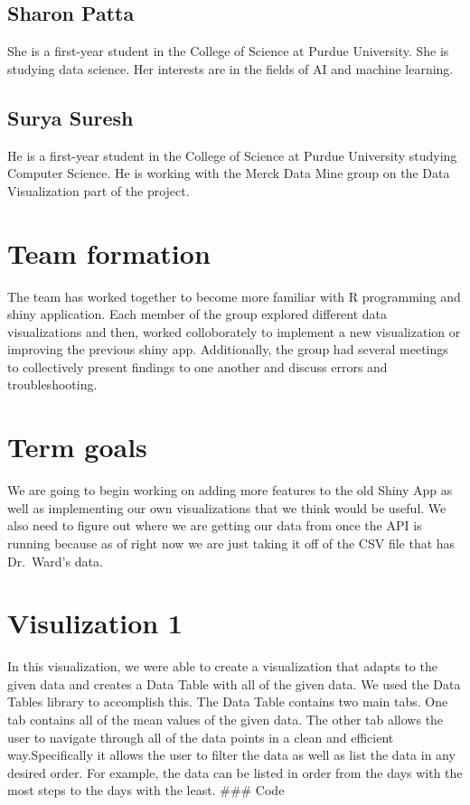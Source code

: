 \documentclass[]{book}
\begin{document}
\subsection{Sharon Patta}\label{sharon-patta}

She is a first-year student in the College of Science at Purdue
University. She is studying data science. Her interests are in the
fields of AI and machine learning.

\subsection{Surya Suresh}\label{surya-suresh}

He is a first-year student in the College of Science at Purdue
University studying Computer Science. He is working with the Merck Data
Mine group on the Data Visualization part of the project.

\section{Team formation}\label{team-formation}

The team has worked together to become more familiar with R programming
and shiny application. Each member of the group explored different data
visualizations and then, worked colloborately to implement a new
visualization or improving the previous shiny app. Additionally, the
group had several meetings to collectively present findings to one
another and discuss errors and troubleshooting.

\section{Term goals}\label{term-goals}

We are going to begin working on adding more features to the old Shiny
App as well as implementing our own visualizations that we think would
be useful. We also need to figure out where we are getting our data from
once the API is running because as of right now we are just taking it
off of the CSV file that has Dr.~Ward's data.

\section{Visulization 1}\label{visulization-1}

In this visualization, we were able to create a visualization that
adapts to the given data and creates a Data Table with all of the given
data. We used the Data Tables library to accomplish this. The Data Table
contains two main tabs. One tab contains all of the mean values of the
given data. The other tab allows the user to navigate through all of the
data points in a clean and efficient way.Specifically it allows the user
to filter the data as well as list the data in any desired order. For
example, the data can be listed in order from the days with the most
steps to the days with the least. \#\#\# Code
\end{document}
